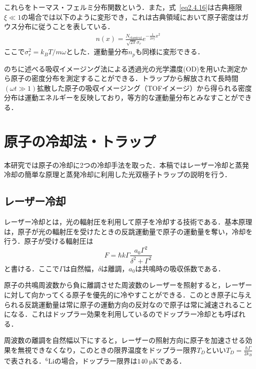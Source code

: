 \documentclass[11pt,a4j,notitlepage]{jreport}
\newcommand{\eq}[1]{式~\eqref{#1}}	%
\begin{document}
これらをトーマス・フェルミ分布関数という．また，\eq{eq2.4.16}は古典極限$\xi \ll 1$の場合では以下のように変形でき，これは古典領域において原子密度はガウス分布に従うことを表している．
\begin{align}
 	n(x) = \frac{N_{\mathrm{classical}}}{\sqrt{2 \pi} \sigma_r} e^{ - \frac{1}{2 \sigma_r^2} x^{2} }
	\label{eq2.4.18}
\end{align}
ここで$\sigma_r^2=k_BT/m \omega$とした．運動量分布$n_p$も同様に変形できる．

のちに述べる吸収イメージング法による透過光の光学濃度(OD)を用いた測定から原子の密度分布を測定することができる．トラップから解放されて長時間$(\omega t \gg 1)$拡散した原子の吸収イメージング（TOFイメージ）から得られる密度分布は運動エネルギーを反映しており，等方的な運動量分布とみなすことができる\cite{demarco}．

\section{原子の冷却法・トラップ}
本研究では原子の冷却に2つの冷却手法を取った．本稿ではレーザー冷却と蒸発冷却の簡単な原理と蒸発冷却に利用した光双極子トラップの説明を行う．

\subsection{レーザー冷却}
レーザー冷却とは，光の輻射圧を利用して原子を冷却する技術である．基本原理は，原子が光の輻射圧を受けたときの反跳運動量で原子の運動量を奪い，冷却を行う．原子が受ける輻射圧は
\begin{equation}
	F= \hbar k \Gamma \frac{a_0 \Gamma^2}{\delta^2 + \Gamma^2}
	\label{eq2.5.1}
\end{equation}
と書ける．ここで$\Gamma$は自然幅，$\delta$は離調，$a_0$は共鳴時の吸収係数である\cite{Kuga}．

原子の共鳴周波数から負に離調させた周波数のレーザーを照射すると，レーザーに対して向かってくる原子を優先的に冷やすことができる．このとき原子に与えられる反跳運動量は常に原子の運動方向の反対なので原子は常に減速されることになる．これはドップラー効果を利用しているのでドップラー冷却とも呼ばれる．

周波数の離調を自然幅以下にすると，レーザーの照射方向に原子を加速させる効果を無視できなくなり，このときの限界温度をドップラー限界$T_D$といい$T_D= \frac{\hbar \Gamma}{2 k_B}$で表される．$^6$Liの場合，ドップラー限界は$140 \ \mathrm{\mu K}$である．
\end{document}

